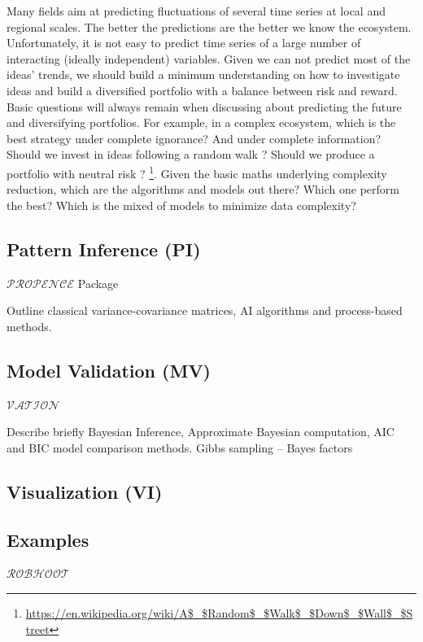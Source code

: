 \documentclass[english,12pt]{article}
\begin{document}
Many fields aim at predicting fluctuations of several time series at
local and regional scales. The better the predictions are the better
we know the ecosystem. Unfortunately, it is not easy to predict time
series of a large number of interacting (ideally independent)
variables. Given we can not predict most of the ideas' trends, we
should build a minimum understanding on how to investigate ideas and
build a diversified portfolio with a balance between risk and
reward. Basic questions will always remain when discussing about
predicting the future and diversifying portfolios. For example, in a
complex ecosystem, which is the best strategy under complete
ignorance? And under complete information?  Should we invest in ideas
following a random walk ? Should we produce a
portfolio with neutral risk ?
\footnote{\url{https://en.wikipedia.org/wiki/A$_$Random$_$Walk$_$Down$_$Wall$_$Street}}. Given
the basic maths underlying complexity reduction, which are the
algorithms and models out there? Which one perform the best? Which is
the mixed of models to minimize data complexity?
\\

\subsection{Pattern Inference (PI)}

$\mathcal{PROPENCE}$ Package

Outline classical variance-covariance matrices, AI
algorithms and process-based methods.

\subsection{Model Validation (MV)}

$\mathcal{VATION}$

Describe briefly Bayesian Inference, Approximate Bayesian computation, AIC and BIC model comparison methods.
Gibbs sampling -- Bayes factors


\subsection{Visualization (VI)}


\subsection{Examples}

$\mathcal{ROBHOOT}$
\end{document}
